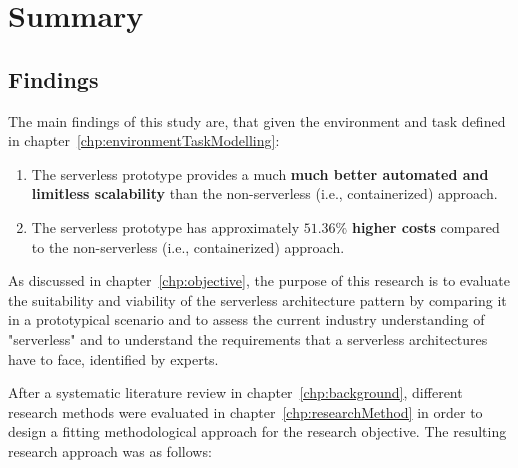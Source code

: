 \chapter{Summary}


\section{Findings}

The main findings of this study are, that given the environment and task defined in chapter~\vref{chp:environmentTaskModelling}: 

\begin{enumerate}[nolistsep]
    \item The serverless prototype provides a much \textbf{much better automated and limitless scalability} than the non-serverless (i.e., containerized) approach. 
    \item The serverless prototype has approximately $51.36\%$ \textbf{higher costs} compared to the non-serverless (i.e., containerized) approach. 
\end{enumerate}

As discussed in chapter~\vref{chp:objective}, the purpose of this research is to evaluate the suitability and viability of the serverless architecture pattern by comparing it in a prototypical scenario and to assess the current industry understanding of "serverless" and to understand the requirements that a serverless architectures have to face, identified by experts.\label{txt:objective}

After a systematic literature review in chapter~\vref{chp:background}, different research methods were evaluated in chapter~\vref{chp:researchMethod} in order to design a fitting methodological approach for the research objective. The resulting research approach was as follows:

